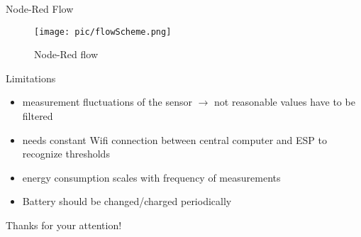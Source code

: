 \documentclass[11pt]{beamer}
\begin{document}
\begin{frame}{Node-Red Flow}
\begin{figure}
\hspace*{-0.6cm}\texttt{[image: pic/flowScheme.png]}
\caption{Node-Red flow}
\label{flow}
\end{figure}
\end{frame}

\begin{frame}{Limitations}
\begin{itemize}
\item measurement fluctuations of the sensor $\to$ not reasonable values have to be filtered
\item needs constant Wifi connection between central computer and ESP to recognize thresholds
\item energy consumption scales with frequency of measurements
\item Battery should be changed/charged periodically
\end{itemize}
\end{frame}

\begin{frame}{}
\center
\huge{Thanks for your attention!}
\end{frame}
\end{document}
